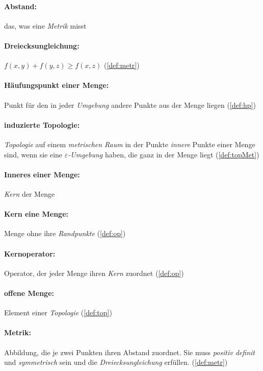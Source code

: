     \paragraph{Abstand:} das, was eine \textit{Metrik} misst
    
    \paragraph{Dreiecksungleichung:} $f(x,y) + f(y,z) \geq f(x,z)$ (\ref{def:metr})

    \paragraph{Häufungspunkt einer Menge:} Punkt für den in jeder \textit{Umgebung} andere Punkte aus der Menge liegen (\ref{def:hp})
    
    \paragraph{induzierte Topologie:} \textit{Topologie} auf einem \textit{metrischen Raum} in der Punkte \textit{innere} Punkte einer Menge sind, wenn sie eine \textit{$\varepsilon$-Umgebung} haben, die ganz in der Menge liegt (\ref{def:topMet})

    \paragraph{Inneres einer Menge:} \textit{Kern} der Menge

    \paragraph{Kern eine Menge:} Menge ohne ihre \textit{Randpunkte} (\ref{def:op})

    \paragraph{Kernoperator:} Operator, der jeder Menge ihren \textit{Kern} zuordnet (\ref{def:op})

    \paragraph{offene Menge:} Element einer \textit{Topologie} (\ref{def:top})
    
    \paragraph{Metrik:} Abbildung, die je zwei Punkten ihren Abstand zuordnet. Sie muss \textit{positiv definit} und \textit{symmetrisch} sein und die \textit{Dreiecksungleichung} erfüllen. (\ref{def:metr})
    
